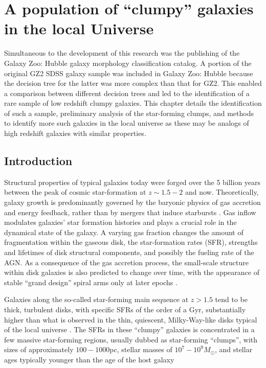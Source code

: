 
\chapter{A population of ``clumpy'' galaxies in the local Universe}
\label{chap:5}

Simultaneous to the development of this research was the publishing of the Galaxy Zoo: Hubble galaxy morphology classification catalog. A portion of the original GZ2 SDSS galaxy sample was included in Galaxy Zoo: Hubble because the decision tree for the latter was more complex than that for GZ2. This enabled a comparison between different decision trees and led to the identification of a rare sample of low redshift clumpy galaxies. This chapter details the identification of such a sample, preliminary analysis of the star-forming clumps, and methods to identify more such galaxies in the local universe as these may be analogs of high redshift galaxies with similar properties.


\section{Introduction}
Structural properties of typical galaxies today were forged over the 5 billion years between the peak of cosmic star-formation at $z\sim1.5-2$ and now. Theoretically,  galaxy growth is predominantly governed by the baryonic physics of gas accretion and energy feedback, rather than by mergers that induce starbursts \citep{Somerville2015}. Gas inflow modulates galaxies' star formation histories and plays a crucial role in the dynamical state of the galaxy. A varying gas fraction changes the amount of fragmentation within the gaseous disk, the star-formation rates (SFR), strengths and lifetimes of disk structural components, and possibly the fueling rate of the AGN. As a consequence of the gas accretion process, the small-scale structure within disk galaxies is also predicted to change over time, with the appearance of stable “grand design” spiral arms only at later epochs \citep{Oppenheimer2010,Bouche2010,Dave2011b,Dave2011a,Lilly2013,Hirschmann2013}.


Galaxies along the so-called star-forming main sequence at $z>1.5$ \citep{Noeske2007} tend to be thick, turbulent disks, with specific SFRs of the order of a Gyr, substantially higher than what is observed in the thin, quiescent, Milky-Way-like disks typical of the local universe \citep{Genzel2008}. The SFRs in these ``clumpy'' galaxies is concentrated in a few massive star-forming regions, usually dubbed as star-forming “clumps”, with sizes of approximately $100-1000$pc, stellar masses of $10^7 - 10^9M_{\odot}$, and stellar ages typically younger than the age of the host galaxy \citep[e.g.,][]{Elmegreen2005,Genzel2011, Guo2012,Guo2015}

